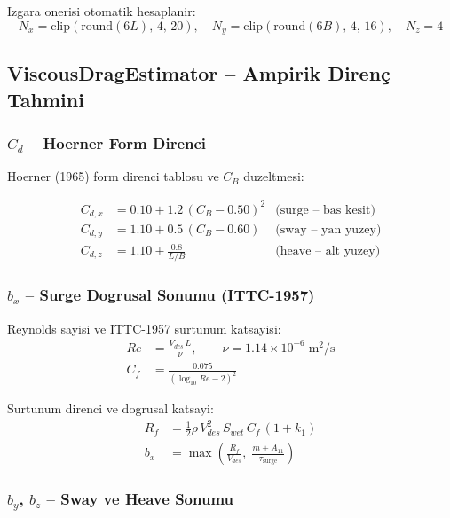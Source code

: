 \documentclass[12pt,a4paper]{article}
\begin{document}
Izgara onerisi otomatik hesaplanir:
\begin{equation}
  N_x = \mathrm{clip}(\mathrm{round}(6L),\,4,\,20),\quad
  N_y = \mathrm{clip}(\mathrm{round}(6B),\,4,\,16),\quad
  N_z = 4
  \label{eq:grid_suggest}
\end{equation}

\subsection{ViscousDragEstimator -- Ampirik Direnç Tahmini}

\subsubsection{$C_d$ -- Hoerner Form Direnci}

Hoerner (1965) form direnci tablosu ve $C_B$ duzeltmesi:

\begin{align}
  C_{d,x} &= 0.10 + 1.2\,(C_B - 0.50)^2
  \label{eq:cdx_hoerner}
  &\text{(surge -- bas kesit)} \\[4pt]
  C_{d,y} &= 1.10 + 0.5\,(C_B - 0.60)
  \label{eq:cdy_hoerner}
  &\text{(sway -- yan yuzey)} \\[4pt]
  C_{d,z} &= 1.10 + \frac{0.8}{L/B}
  \label{eq:cdz_hoerner}
  &\text{(heave -- alt yuzey)}
\end{align}

\subsubsection{$b_x$ -- Surge Dogrusal Sonumu (ITTC-1957)}

Reynolds sayisi ve ITTC-1957 surtunum katsayisi:
\begin{align}
  Re &= \frac{V_{des}\,L}{\nu}, \qquad \nu = 1.14\times10^{-6}\;\text{m}^2/\text{s}
  \label{eq:reynolds} \\[4pt]
  C_f &= \frac{0.075}{(\log_{10} Re - 2)^2}
  \label{eq:cf_ittc}
\end{align}

Surtunum direnci ve dogrusal katsayi:
\begin{align}
  R_f &= \tfrac{1}{2}\rho\,V_{des}^2\,S_{wet}\,C_f\,(1+k_1)
  \label{eq:rf} \\[4pt]
  b_x &= \max\!\left(\frac{R_f}{V_{des}},\;\frac{m+A_{11}}{\tau_{\text{surge}}}\right)
  \label{eq:bx}
\end{align}

\subsubsection{$b_y$, $b_z$ -- Sway ve Heave Sonumu}
\end{document}
